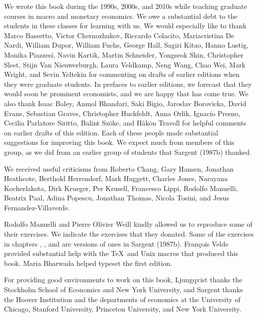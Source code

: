   \noindent We wrote this book during the 1990s, 2000s, and  2010s while
teaching graduate courses
in macro and monetary economics.
 We owe a substantial  debt to
the students in these classes for learning with us. We would
especially like to thank Marco Bassetto,
Victor Chernozhukov,
Riccardo Colacito, Mariacristina De Nardi, William Dupor, William
Fuchs, George Hall, Sagiri Kitao, Hanno Lustig,
 Monika Piazzesi, Navin Kartik,
Martin Schneider,   Yongseok Shin, Christopher
Sleet, Stijn Van Nieuwerburgh, Laura Veldkamp, Neng  Wang, Chao
Wei, Mark Wright, and Sevin Yeltekin for commenting on drafts of earlier editions when they
were graduate students.  In prefaces to earlier editions, we forecast that they would soon be prominent
economists, and we are happy that  has come true.
We also thank
 Isaac Baley, Anmol Bhandari,  Saki Bigio,  Jaroslav Borovicka,  David Evans, Sebastian Graves, Christopher Huckfeldt, Anna Orlik,  Ignacio Presno, Cecilia Parlatore Siritto,  Balint Sz\"oke, and    H\aa k\.on Travoll for helpful comments
 on earlier drafts of this edition.  Each
of these people made substantial suggestions for improving this
book. We expect much from members of this group, as we did from an
earlier group of students that Sargent  (1987b) thanked.


We received useful
 criticisms from Roberto Chang,
Gary Hansen, Jonathan Heathcote, Berthold Herrendorf,  Mark
Huggett, Charles Jones, Narayana Kocherlakota, Dirk Krueger, Per
Krusell, Francesco Lippi, Rodolfo Manuelli, Beatrix Paal, Adina
Popescu, Jonathan Thomas,  Nicola Tosini, and Jesus Fernandez-Villaverde.


Rodolfo Manuelli and Pierre Olivier Weill kindly allowed us to reproduce some of their
exercises. We indicate the exercises that  they donated.
 Some of the exercises in chapters
, ,  and  are versions of ones in Sargent (1987b).
Fran\c cois Velde provided  substantial help with the \TeX \ and
Unix macros that produced this book.
 Maria Bharwada helped  typeset the first edition.

For providing good environments to work on this book, Ljungqvist
thanks the Stockholm School of Economics and New York University, 
and Sargent thanks the
Hoover Institution and the departments of economics at the
University of Chicago, Stanford University, Princeton University, and New York
University.
